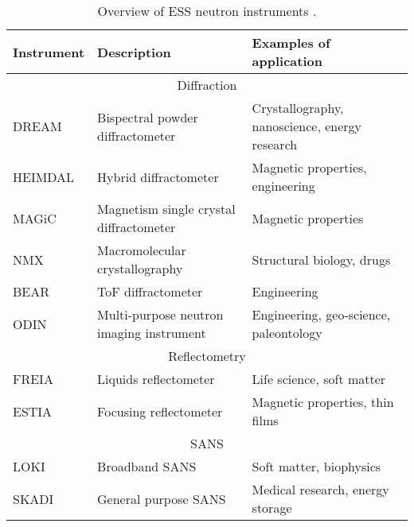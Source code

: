 \begin{table}[ht]
  \centering
  \caption[Overview of ESS neutron instruments]
  {Overview of ESS neutron instruments \cite{essInstrument,essInstrument2}.}
  \label{chap2:tab:ess_instruments}
  \begin{tabularx}{\linewidth}{lXp{128pt}}
    \toprule
    Instrument & Description                              & Examples of application                                \\
    \midrule

    \multicolumn{3}{c}{Diffraction}                                                                                \\
    \midrule

    DREAM      & Bispectral powder diffractometer         & Crystallography, nanoscience, energy research          \\
    HEIMDAL    & Hybrid diffractometer                    & Magnetic properties, engineering                       \\
    MAGiC      & Magnetism single crystal diffractometer  & Magnetic properties                                    \\
    NMX        & Macromolecular crystallography           & Structural biology, drugs                              \\
    BEAR       & ToF diffractometer                       & Engineering                                            \\
    ODIN       & Multi-purpose neutron imaging instrument & Engineering, geo-science, paleontology                 \\

    \midrule

    \multicolumn{3}{c}{Reflectometry}                                                                              \\
    \midrule
    FREIA      & Liquids reflectometer                    & Life science, soft matter                              \\
    ESTIA      & Focusing reflectometer                   & Magnetic properties, thin films                        \\

    \midrule

    \multicolumn{3}{c}{SANS}                                                                                       \\
    \midrule
    LOKI       & Broadband SANS                           & Soft matter, biophysics                                \\
    SKADI      & General purpose SANS                     & Medical research, energy storage                                                      \\


\end{tabularx}
\end{table}
